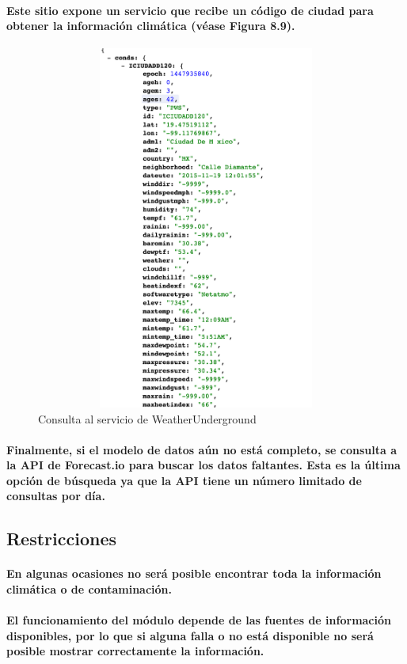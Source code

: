   \paragraph{Este sitio expone un servicio que recibe un código de ciudad para obtener la información climática (véase Figura 8.9).}
    \begin{figure}[b!]
      \centering 
      \includegraphics[width=12cm,height=12cm]{./images/WeatherUnderground}
      \caption{Consulta al servicio de WeatherUnderground}
    \end{figure}
  \paragraph{Finalmente, si el modelo de datos aún no está completo, se consulta a la API de Forecast.io para buscar los datos faltantes. Esta es la última opción de búsqueda ya que la API tiene un número limitado de consultas por día.}
  \newpage
  
  \subsection{Restricciones}
    \paragraph{En algunas ocasiones no será posible encontrar toda la información climática o de contaminación.}
    \paragraph{El funcionamiento del módulo depende de las fuentes de información disponibles, por lo que si alguna falla o no está disponible no será posible mostrar correctamente la información.}
